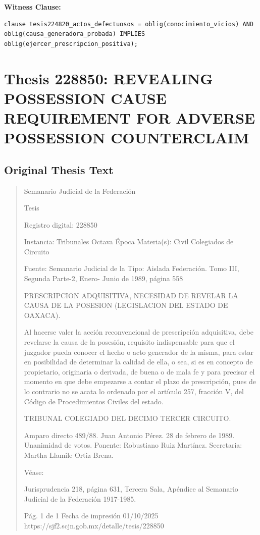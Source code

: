 \documentclass[11pt,a4paper]{article}
\begin{document}
\textbf{Witness Clause:}

\begin{lstlisting}[style=witnessstyle, language=Witness]
clause tesis224820_actos_defectuosos = oblig(conocimiento_vicios) AND oblig(causa_generadora_probada) IMPLIES oblig(ejercer_prescripcion_positiva);
\end{lstlisting}

\newpage

\section{Thesis 228850: REVEALING POSSESSION CAUSE REQUIREMENT FOR ADVERSE POSSESSION COUNTERCLAIM}
\label{thesis:228850}

\subsection{Original Thesis Text}

\begin{quote}
                                                   Semanario Judicial de la Federación

                                                  Tesis

 Registro digital: 228850

 Instancia: Tribunales            Octava Época                         Materia(s): Civil
 Colegiados de Circuito

                                  Fuente: Semanario Judicial de la     Tipo: Aislada
                                  Federación.
                                  Tomo III, Segunda Parte-2, Enero-
                                  Junio de 1989, página 558


PRESCRIPCION ADQUISITIVA, NECESIDAD DE REVELAR LA CAUSA DE LA POSESION
(LEGISLACION DEL ESTADO DE OAXACA).


Al hacerse valer la acción reconvencional de prescripción adquisitiva, debe revelarse la causa de la
posesión, requisito indispensable para que el juzgador pueda conocer el hecho o acto generador de
la misma, para estar en posibilidad de determinar la calidad de ella, o sea, si es en concepto de
propietario, originaria o derivada, de buena o de mala fe y para precisar el momento en que debe
empezarse a contar el plazo de prescripción, pues de lo contrario no se acata lo ordenado por el
artículo 257, fracción V, del Código de Procedimientos Civiles del estado.

TRIBUNAL COLEGIADO DEL DECIMO TERCER CIRCUITO.


Amparo directo 489/88. Juan Antonio Pérez. 28 de febrero de 1989. Unanimidad de votos. Ponente:
Robustiano Ruiz Martínez. Secretaria: Martha Llamile Ortiz Brena.

Véase:

Jurisprudencia 218, página 631, Tercera Sala, Apéndice al Semanario Judicial de la Federación
1917-1985.




                                             Pág. 1 de 1            Fecha de impresión 01/10/2025
  https://sjf2.scjn.gob.mx/detalle/tesis/228850

\end{quote}
\end{document}
